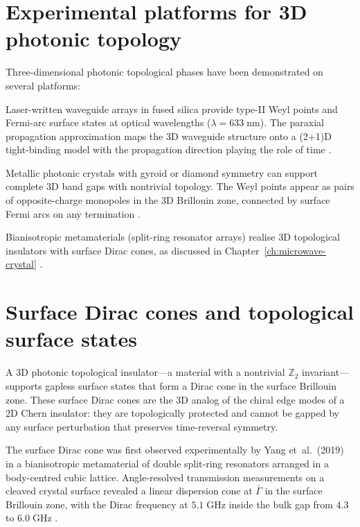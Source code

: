 \section{Experimental platforms for 3D photonic topology}
\label{sec:ch15-3d-platforms}

Three-dimensional photonic topological phases have been demonstrated
on several platforms:

Laser-written waveguide arrays in fused silica provide type-II Weyl
points and Fermi-arc surface states at optical wavelengths
($\lambda=633\;\mathrm{nm}$).  The paraxial propagation approximation
maps the 3D waveguide structure onto a (2+1)D tight-binding model
with the propagation direction playing the role of time
\cite{noh2017experimental,rechtsman2013photonica}.

Metallic photonic crystals with gyroid or diamond symmetry can
support complete 3D band gaps with nontrivial topology.  The
Weyl points appear as pairs of opposite-charge monopoles in the
3D Brillouin zone, connected by surface Fermi arcs on any
termination \cite{ozawa2018topological}.

Bianisotropic metamaterials (split-ring resonator arrays) realise
3D topological insulators with surface Dirac cones, as discussed in
Chapter~\ref{ch:microwave-crystal}
\cite{yang2018realization,price2022roadmap}.

\section{Surface Dirac cones and topological surface states}
\label{sec:ch15-surface-dirac-cone}

A 3D photonic topological insulator---a material with a nontrivial
$\mathbb{Z}_2$ invariant---supports gapless surface states that form
a Dirac cone in the surface Brillouin zone.  These surface Dirac
cones are the 3D analog of the chiral edge modes of a 2D Chern
insulator: they are topologically protected and cannot be gapped by
any surface perturbation that preserves time-reversal symmetry.

The surface Dirac cone was first observed experimentally by Yang
et~al.\ (2019) in a bianisotropic metamaterial of double split-ring
resonators arranged in a body-centred cubic lattice.  Angle-resolved
transmission measurements on a cleaved crystal surface revealed a
linear dispersion cone at $\bar{\Gamma}$ in the surface Brillouin zone,
with the Dirac frequency at $5.1\;\mathrm{GHz}$ inside the bulk gap
from 4.3 to $6.0\;\mathrm{GHz}$
\cite{yang2018realization,ozawa2018topological}.

